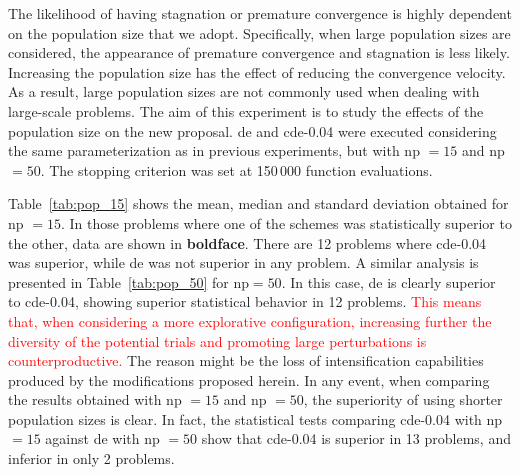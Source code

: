 \documentclass[preprint,3p]{elsarticle}
\newcommand{\CDE}{c{\sc de}}
\newcommand{\DE}{{\sc de}}
\newcommand{\NP}{{\sc np}}
\begin{document}
The likelihood of having stagnation or premature convergence is highly dependent on the population size that we adopt.
%
Specifically, when large population sizes are considered, the appearance of premature convergence and stagnation is less likely.
%
Increasing the population size has the effect of reducing the convergence velocity. As a result, large population sizes
are not commonly used when dealing with large-scale problems.
%
The aim of this experiment is to study the effects of the population size on the new proposal.
%
\DE{} and \CDE{}-0.04 were executed considering the same parameterization
as in previous experiments, but with \NP{} $= 15$ and \NP{} $= 50$.
%
The stopping criterion was set at 150$\,$000 function evaluations.

Table~\ref{tab:pop_15} shows the mean, median and standard deviation obtained for \NP{} $= 15$.
%
In those problems where one of the schemes was statistically superior to the other, data are shown in {\bf boldface}.
%
There are 12 problems where \CDE{}-0.04 was superior, while \DE{} was not superior in any problem.
%
A similar analysis is presented in Table~\ref{tab:pop_50} for \NP{}$ = 50$.
%
In this case, \DE{} is clearly superior to \CDE{}-0.04, showing superior statistical behavior in 12 problems.
%
\textcolor{red}{
This means that, when considering a more explorative configuration, increasing further the diversity of the potential
trials and promoting large perturbations is counterproductive.
}
%
The reason might be the loss of intensification capabilities produced by the modifications proposed herein.
%
In any event, when comparing the results obtained with \NP{} $= 15$ and \NP{} $= 50$, the superiority of using shorter population sizes is clear.
%
In fact, the statistical tests comparing \CDE{}-0.04 with \NP{} $= 15$ against \DE{} with \NP{} $= 50$ show that \CDE{}-0.04 is superior
in 13 problems, and inferior in only 2 problems.



\end{document}
